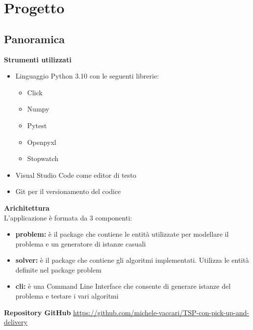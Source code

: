 \documentclass[9pt]{beamer}
\begin{document}
\section{Progetto}

\subsection{Panoramica}
\begin{frame}[allowframebreaks]{\subsecname}

	\textbf{Strumenti utilizzati}
	\begin{itemize}
		\item
		Linguaggio Python 3.10 con le seguenti librerie:
		\begin{itemize}
			\item
			Click
			\item
			Numpy
			\item
			Pytest
			\item
			Openpyxl
			\item
			Stopwatch
		\end{itemize}
		\item
		Visual Studio Code come editor di testo
		\item
		Git per il versionamento del codice
	\end{itemize}

\framebreak

	\textbf{Arichitettura} \\
	L’applicazione è formata da 3 componenti:
	\begin{itemize}
		\item
		\textbf{problem:} è il package che contiene le entità utilizzate per modellare il problema e un generatore di istanze casuali
		\item
		\textbf{solver:} è il package che contiene gli algoritmi implementati. Utilizza le entità definite nel package problem
		\item
		\textbf{cli:} è una Command Line Interface che consente di generare istanze del problema e testare i vari algoritmi
	\end{itemize}

	\textbf{Repository GitHub} \href{https://github.com/michele-vaccari/TSP-con-pick-up-and-delivery}{https://github.com/michele-vaccari/TSP-con-pick-up-and-delivery}

\end{frame}
\end{document}
